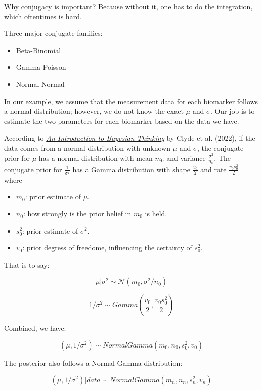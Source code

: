 \documentclass[
  letterpaper,
  DIV=11,
  numbers=noendperiod]{scrreprt}
\providecommand{\tightlist}{%
  \setlength{\itemsep}{0pt}\setlength{\parskip}{0pt}}\usepackage{longtable,booktabs,array}
\begin{document}
Why conjugacy is important? Because without it, one has to do the
integration, which oftentimes is hard.

Three major conjugate families:

\begin{itemize}
\tightlist
\item
  Beta-Binomial
\item
  Gamma-Poisson
\item
  Normal-Normal
\end{itemize}

In our example, we assume that the measurement data for each biomarker
follows a normal distribution; however, we do not know the exact \(\mu\)
and \(\sigma\). Our job is to estimate the two parameters for each
biomarker based on the data we have.

According to
\href{https://statswithr.github.io/book/inference-and-decision-making-with-multiple-parameters.html\#sec:normal-gamma}{\emph{An
Introduction to Bayesian Thinking}} by Clyde et al. (2022), if the data
comes from a normal distribution with unknown \(\mu\) and \(\sigma\),
the conjugate prior for \(\mu\) has a normal distribution with mean
\(m_0\) and variance \(\frac{\sigma^2}{n_0}\). The conjugate prior for
\(\frac{1}{\sigma^2}\) has a Gamma distribution with shape
\(\frac{v_0}{2}\) and rate \(\frac{v_0 s_0^{2}}{2}\) where

\begin{itemize}
\tightlist
\item
  \(m_0\): prior estimate of \(\mu\).
\item
  \(n_0\): how strongly is the prior belief in \(m_0\) is held.
\item
  \(s_0^2\): prior estimate of \(\sigma^2\).
\item
  \(v_0\): prior degress of freedome, influencing the certainty of
  \(s_0^2\).
\end{itemize}

That is to say:

\[\mu | \sigma^2 \sim \mathcal{N}(m_0, \sigma^2/n_0)\]

\[1/\sigma^2 \sim Gamma\left(\frac{v_0}{2}, \frac{v_0 s_0^2}{2} \right)\]

Combined, we have:

\[(\mu, 1/\sigma^2) \sim NormalGamma(m_0, n_0, s_0^2, v_0)\]

The posterior also follows a Normal-Gamma distribution:

\[(\mu, 1/\sigma^2) | data \sim NormalGamma(m_n, n_n, s_n^2, v_n)\]
\end{document}
